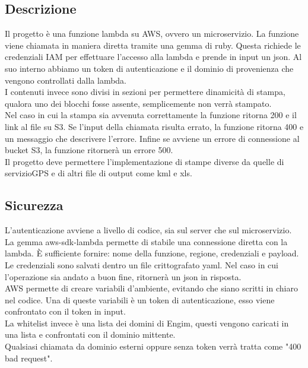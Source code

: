 \documentclass[12pt]{article}
\begin{document}
\subsection{Descrizione}
Il progetto è una funzione lambda su AWS, ovvero un microservizio. La funzione 
viene chiamata in maniera diretta tramite una gemma di ruby.
Questa richiede le credenziali IAM per effettuare l'accesso alla lambda e prende 
in input un json. Al suo interno abbiamo un token di autenticazione e il dominio 
di provenienza che vengono controllati dalla lambda. 
\\ I contenuti invece sono divisi in sezioni per permettere dinamicità di stampa, 
qualora uno dei blocchi fosse assente, semplicemente non verrà stampato. 
\\ Nel caso in cui la stampa sia avvenuta correttamente la funzione ritorna 200 e 
il link al file su S3. Se l'input della chiamata risulta errato, la funzione ritorna 
400 e un messaggio che descrivere l'errore. Infine se avviene un errore di connessione 
al bucket S3, la funzione ritornerà un errore 500.    
\\ Il progetto deve permettere l'implementazione di stampe diverse da quelle di servizioGPS
e di altri file di output come kml e xls. 



\subsection{Sicurezza}
L'autenticazione avviene a livello di codice, sia sul server che sul microservizio.
\\ La gemma aws-sdk-lambda permette di stabile una connessione diretta con la 
lambda. È sufficiente fornire: nome della funzione, regione, credenziali e payload. 
Le credenziali sono salvati dentro un file crittografato yaml. Nel caso in cui 
l'operazione sia andato a buon fine, ritornerà un json in risposta.
\\ AWS permette di creare variabili
d'ambiente, evitando che siano scritti in chiaro nel codice. Una di queste variabili 
è un token di autenticazione, esso viene confrontato con il token in input. 
\\ La whitelist invece è una lista dei domini di Engim, questi vengono caricati in 
una lista e confrontati con il dominio mittente. 
\\ Qualsiasi chiamata da dominio esterni oppure senza token verrà tratta come 
"400 bad request". 
\end{document}
